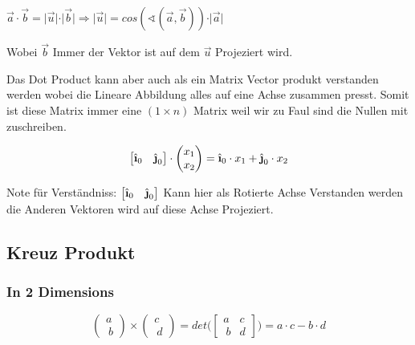 \documentclass[12pt]{article}
\begin{document}
\( \overrightarrow{a} \cdot \overrightarrow{b} = \vert \overrightarrow{u} \vert \cdot \vert \overrightarrow{b} \vert \Rightarrow \vert \overrightarrow{u} \vert =  cos(\sphericalangle (\overrightarrow{a}, \overrightarrow{b} )) \cdot \vert \overrightarrow{a} \vert \)

Wobei \( \overrightarrow{b} \) Immer der Vektor ist auf dem \( \overrightarrow{u} \) Projeziert wird. \newline 

Das Dot Product kann aber auch als ein Matrix Vector produkt verstanden werden wobei die Lineare Abbildung alles auf eine Achse zusammen presst. Somit ist diese Matrix immer eine \( ( 1 \times n ) \) Matrix weil wir zu Faul sind die Nullen mit zuschreiben.

\begin{equation} 
\begin{bmatrix}
\ihat_0 & \jhat_0
\end{bmatrix}  
\cdot 
\begin{pmatrix}
x_1 \\ x_2
\end{pmatrix} = \ihat_0 \cdot x_1 + \jhat_0 \cdot x_2 
\end{equation}


Note für Verständniss: \( \begin{bmatrix}
\ihat_0 & \jhat_0
\end{bmatrix}   \) Kann hier als Rotierte Achse Verstanden werden die Anderen Vektoren wird auf diese Achse Projeziert.

\subsection*{ Kreuz Produkt} 

\subsubsection*{ In 2 Dimensions}

\begin{equation}
	 \begin{pmatrix}
	 	a  \\\
	 	b
	 \end{pmatrix} \times 	 \begin{pmatrix}
	 	c  \\\
	 	d
	 \end{pmatrix} = det \bigg( \begin{bmatrix}
	 	a & c \\\
	 	b & d
	 \end{bmatrix} \bigg) = a \cdot c - b \cdot d
\end{equation}
\end{document}
